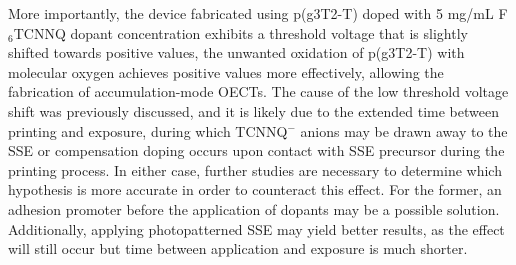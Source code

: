 More importantly, the device fabricated using p(g3T2-T) doped with 5 mg/mL F$_{6}$TCNNQ dopant concentration exhibits a threshold voltage that is slightly shifted towards positive values, the unwanted oxidation of p(g3T2-T) with molecular oxygen achieves positive values more effectively, allowing the fabrication of accumulation-mode OECTs. The cause of the low threshold voltage shift was previously discussed, and it is likely due to the extended time between printing and exposure, during which TCNNQ$^{-}$ anions may be drawn away to the SSE or compensation doping occurs upon contact with SSE precursor during the printing process. In either case, further studies are necessary to determine which hypothesis is more accurate in order to counteract this effect. For the former, an adhesion promoter before the application of dopants may be a possible solution. Additionally, applying photopatterned SSE may yield better results, as the effect will still occur but time between application and exposure is much shorter.



 


